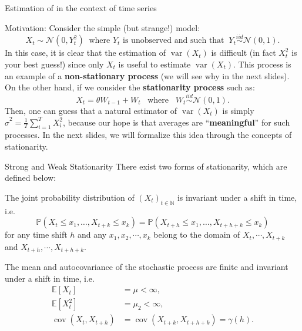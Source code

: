 \documentclass[envcountsect,usenames,dvipsnames]{beamer}
\DeclareMathOperator*{\cov}{cov}
\DeclareMathOperator*{\var}{var}
\theoremstyle{mystyle}
\begin{document}
\begin{frame}{Estimation of in the context of time series}
	\small
	\begin{exampleblock}{Motivation:}
		Consider the simple (but strange!) model:
		\begin{equation*}
			X_t  \sim \mathcal{N} \left(0, Y_t^2\right) \;\; \text{where $Y_t$ is unobserved and such that} \;\; Y_t  \stackrel{iid}{\sim} \mathcal{N} \left(0, 1\right).
		\end{equation*}
		In this case, it is clear that the estimation of $\var(X_t)$ is difficult (in fact $X_t^2$ is your best guess!) since only $X_t$ is useful to estimate $\var(X_t)$. This process is an example of a {\color{beamer@UIUCblue}\textbf{non-stationary process}} (we will see why in the next slides). On the other hand, if we consider the {\color{beamer@UIUCblue}\textbf{stationarity process}} such as:
		\begin{equation*}
			X_t = \theta W_{t-1} + W_t \;\;\; \text{where} \;\;\;  W_t  \stackrel{iid}{\sim} \mathcal{N} \left(0, 1\right).
		\end{equation*}
		Then, one can guess that a natural estimator of $\var(X_t)$ is simply $\hat{\sigma}^2 = \frac{1}{T} \sum_{i = 1}^T X_i^2$, 
		because our hope is that averages are ``{\color{beamer@myorange}\textbf{meaningful}}'' for such processes. In the next slides, we will formalize this idea through the concepts of stationarity.
	\end{exampleblock}
\end{frame}


\begin{frame}{Strong and Weak Stationarity}
\small
There exist two forms of stationarity, which are defined below:

	\begin{Definition}
		The joint probability distribution of $(X_{t})_{t \in \mathbb{N}}$ is invariant under a shift in time, i.e.
			\begin{equation*}
				\mathbb{P}(X_{t}\leq x_{1},\hdots,X_{t+k}\leq x_{k}) =
						\mathbb{P}(X_{t+h}\leq x_{1} ,\hdots,X_{t+h+k}\leq x_{k})
			\end{equation*}
		for any time shift $h$ and any $x_{1},x_{2},\cdots,x_{k}$ belong to the domain of $X_t,\cdots,X_{t+k}$ and $X_{t+h},\cdots,X_{t+h+k}$. %
	\end{Definition}
	
	\begin{Definition}
		The mean and autocovariance of the stochastic process are finite and invariant under a shift in time, i.e.
		\begin{equation*}
			\begin{aligned}
				\mathbb{E}\left[X_t\right] &= \mu < \infty,\\
				\mathbb{E}\left[X_t^2\right]  &= \mu_2 < \infty,\\
				\cov(X_{t},X_{t+h})&= \cov(X_{t + k},X_{t+h + k})
				= \gamma( h ).
			\end{aligned}
		\end{equation*}
	\end{Definition}
	

\end{frame}
\end{document}
